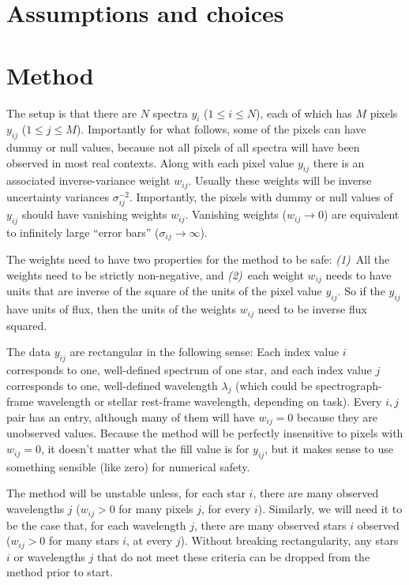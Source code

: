\documentclass{article}
\begin{document}
\section{Assumptions and choices}

\section{Method}
The setup is that there are $N$ spectra $y_i$ ($1\leq i\leq N$),
each of which has $M$ pixels $y_{ij}$ ($1\leq j\leq M$).
Importantly for what follows, some of the pixels can have dummy or null values, because not all pixels of all spectra will have been observed in most real contexts.
Along with each pixel value $y_{ij}$ there is an associated inverse-variance weight $w_{ij}$.
Usually these weights will be inverse uncertainty variances $\sigma_{ij}^{-2}$.
Importantly, the pixels with dummy or null values of $y_{ij}$ should have vanishing weights $w_{ij}$.
Vanishing weights ($w_{ij}\rightarrow 0$) are equivalent to infinitely large ``error bars'' ($\sigma_{ij}\rightarrow\infty$).

The weights need to have two properties for the method to be safe:
\textsl{(1)}~All the weights need to be strictly non-negative, and
\textsl{(2)}~each weight $w_{ij}$ needs to have units that are inverse of the square of the units of the pixel value $y_{ij}$.
So if the $y_{ij}$ have units of flux, then the units of the weights $w_{ij}$ need to be inverse flux squared.

The data $y_{ij}$ are rectangular in the following sense:
Each index value $i$ corresponds to one, well-defined spectrum of one star, and
each index value $j$ corresponds to one, well-defined wavelength $\lambda_j$ (which could be spectrograph-frame wavelength or stellar rest-frame wavelength, depending on task).
Every $i,j$ pair has an entry, although many of them will have $w_{ij}=0$ because they are unobserved values.
Because the method will be perfectly insensitive to pixels with $w_{ij}=0$, it doesn't matter what the fill value is for $y_{ij}$, but it makes sense to use something sensible (like zero) for numerical safety.

The method will be unstable unless, for each star $i$, there are many observed wavelengths $j$ ($w_{ij} > 0$ for many pixels $j$, for every $i$).
Similarly, we will need it to be the case that, for each wavelength $j$, there are many observed stars $i$ observed ($w_{ij} > 0$ for many stars $i$, at every $j$).
Without breaking rectangularity, any stars $i$ or wavelengths $j$ that do not meet these criteria can be dropped from the method prior to start.
\end{document}
